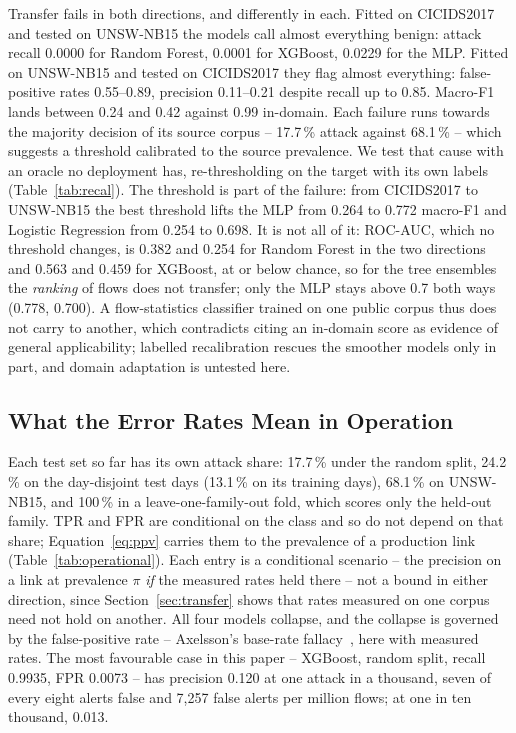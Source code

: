 \documentclass{llncs}
\newcommand{\inputtable}[1]{%
  \IfFileExists{tables/#1.tex}{}{}}
\begin{document}
Transfer fails in both directions, and differently in each. Fitted on
CICIDS2017 and tested on UNSW-NB15 the models call almost everything benign:
attack recall 0.0000 for Random Forest, 0.0001 for XGBoost, 0.0229 for the
MLP. Fitted on UNSW-NB15 and tested on CICIDS2017 they flag almost
everything: false-positive rates 0.55--0.89, precision 0.11--0.21 despite
recall up to 0.85. Macro-F1 lands between 0.24 and 0.42 against 0.99
in-domain. Each failure runs towards the majority decision of its source
corpus -- 17.7\,\% attack against 68.1\,\% -- which suggests a threshold
calibrated to the source prevalence. We test that cause with an oracle no
deployment has, re-thresholding on the target with its own labels
(Table~\ref{tab:recal}). The threshold is part of the failure: from
CICIDS2017 to UNSW-NB15 the best threshold lifts the MLP from 0.264 to 0.772
macro-F1 and Logistic Regression from 0.254 to 0.698. It is not all of it:
ROC-AUC, which no threshold changes, is 0.382 and 0.254 for Random Forest in
the two directions and 0.563 and 0.459 for XGBoost, at or below chance, so
for the tree ensembles the \emph{ranking} of flows does not transfer; only
the MLP stays above 0.7 both ways (0.778, 0.700). A flow-statistics
classifier trained on one public corpus thus does not carry to another, which
contradicts citing an in-domain score as evidence of general applicability;
labelled recalibration rescues the smoother models only in part, and domain
adaptation is untested here.

\inputtable{recalibration}

\subsection{What the Error Rates Mean in Operation}
\label{sec:operational}
Each test set so far has its own attack share: 17.7\,\% under the random
split, 24.2\,\% on the day-disjoint test days (13.1\,\% on its training
days), 68.1\,\% on UNSW-NB15, and 100\,\% in a leave-one-family-out fold,
which scores only the held-out family. TPR and FPR are conditional on the
class and so do not depend on that share; Equation~\ref{eq:ppv} carries them
to the prevalence of a production link (Table~\ref{tab:operational}). Each
entry is a conditional scenario -- the precision on a link at prevalence
$\pi$ \emph{if} the measured rates held there -- not a bound in either
direction, since Section~\ref{sec:transfer} shows that rates measured on one
corpus need not hold on another. All four models collapse, and
the collapse is governed by the false-positive rate -- Axelsson's base-rate
fallacy~\cite{axelsson1999baserate}, here with measured rates. The most favourable case
in this paper -- XGBoost, random split, recall 0.9935, FPR 0.0073 -- has
precision 0.120 at one attack in a thousand, seven of every eight alerts
false and 7{,}257 false alerts per million flows; at one in ten thousand,
0.013.
\end{document}
